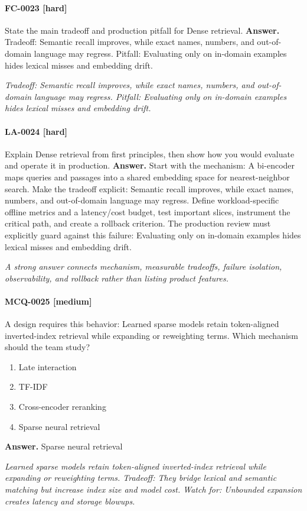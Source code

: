 \paragraph{FC-0023 [hard]} State the main tradeoff and production pitfall for Dense retrieval.
\noindent\textbf{Answer.} Tradeoff: Semantic recall improves, while exact names, numbers, and out-of-domain language may regress. Pitfall: Evaluating only on in-domain examples hides lexical misses and embedding drift.
\par\textit{Tradeoff: Semantic recall improves, while exact names, numbers, and out-of-domain language may regress. Pitfall: Evaluating only on in-domain examples hides lexical misses and embedding drift.}
\paragraph{LA-0024 [hard]} Explain Dense retrieval from first principles, then show how you would evaluate and operate it in production.
\noindent\textbf{Answer.} Start with the mechanism: A bi-encoder maps queries and passages into a shared embedding space for nearest-neighbor search. Make the tradeoff explicit: Semantic recall improves, while exact names, numbers, and out-of-domain language may regress. Define workload-specific offline metrics and a latency/cost budget, test important slices, instrument the critical path, and create a rollback criterion. The production review must explicitly guard against this failure: Evaluating only on in-domain examples hides lexical misses and embedding drift.
\par\textit{A strong answer connects mechanism, measurable tradeoffs, failure isolation, observability, and rollback rather than listing product features.}
\paragraph{MCQ-0025 [medium]} A design requires this behavior: Learned sparse models retain token-aligned inverted-index retrieval while expanding or reweighting terms. Which mechanism should the team study?
\begin{enumerate}[label=\Alph*.]
\item Late interaction
\item TF-IDF
\item Cross-encoder reranking
\item Sparse neural retrieval
\end{enumerate}
\noindent\textbf{Answer.} Sparse neural retrieval
\par\textit{Learned sparse models retain token-aligned inverted-index retrieval while expanding or reweighting terms. Tradeoff: They bridge lexical and semantic matching but increase index size and model cost. Watch for: Unbounded expansion creates latency and storage blowups.}
